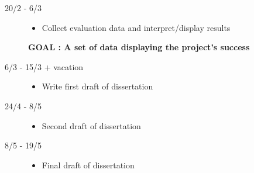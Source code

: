 \documentclass[12pt,a4paper]{article}
\begin{document}
\begin{description}
	\item[20/2 - 6/3] \hfill
	\begin{itemize}
		\item Collect evaluation data and interpret/display results
	\end{itemize}
	\textbf{GOAL : A set of data displaying the project's success}
	
	
	\item[6/3 - 15/3 + vacation] \hfill
	\begin{itemize}
		\item Write first draft of dissertation
	\end{itemize}
	
	\item[24/4 - 8/5] \hfill
	\begin{itemize}
		\item Second draft of dissertation
	\end{itemize}
	
	\item[8/5 - 19/5] \hfill
	\begin{itemize}
		\item Final draft of dissertation
	\end{itemize}
\end{description}
\end{document}
